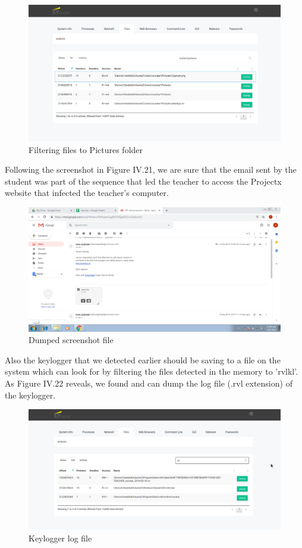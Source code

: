 \begin{figure}[H]
\centering
\includegraphics[width=0.9\columnwidth]{Figures/20.png}
\caption{Filtering files to Pictures folder}
\end{figure}
Following the screenshot in Figure IV.21, we are sure that the email sent by the student was part of the sequence that led the teacher to access the Projectx website that infected the teacher's computer.
\begin{figure}[H]
\centering
\includegraphics[width=0.9\columnwidth]{Figures/21.png}
\caption{Dumped screenshot file}
\end{figure}
Also the keylogger that we detected earlier should be saving to a file on the system which can look for by filtering the files detected in the memory to 'rvlkl'. As Figure IV.22 reveals, we found and can dump the log file (.rvl extension) of the keylogger.
\begin{figure}[H]
\centering
\includegraphics[width=0.9\columnwidth]{Figures/22.png}
\caption{Keylogger log file}
\end{figure}

